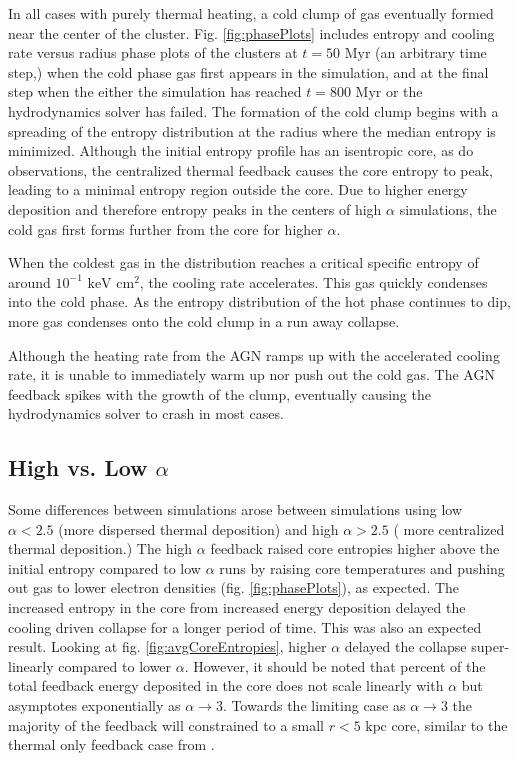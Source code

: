 \documentclass[iop,apjl, twocolappendix]{emulateapj}   %
\begin{document}
In all cases with purely thermal heating, a cold clump of gas eventually formed
near the center of the cluster. Fig. \ref{fig:phasePlots} includes entropy and
cooling rate versus radius phase plots of the clusters at $t=50 \text{ Myr}$
(an arbitrary time step,) when the cold phase gas first appears in the
simulation, and at the final step when the either the simulation has reached
$t=800 \text{ Myr}$ or the hydrodynamics solver has failed. The formation of
the cold clump begins with a spreading of the entropy distribution at the
radius where the median entropy 
is minimized. Although the initial entropy profile has an isentropic core, as
do observations, the centralized thermal feedback causes the core entropy to
peak, leading to a minimal entropy region outside the core. Due to higher
energy deposition and therefore entropy peaks in the centers of high $\alpha$
simulations, the cold gas first forms further from the core for higher
$\alpha$.

When the coldest gas in the distribution reaches a critical specific entropy of
around $10^{-1} \text{ keV} \text{ cm}^2$, the cooling rate accelerates. This
gas quickly condenses into the cold phase. As the entropy distribution of the
hot phase continues to dip, more gas condenses onto the cold clump in a run
away collapse. 

Although the heating rate from the AGN ramps up with the accelerated cooling
rate, it is unable to immediately warm up nor push out the cold gas. The AGN
feedback spikes with the growth of the clump, eventually causing the
hydrodynamics solver to crash in most cases.

\subsection{High vs. Low $\alpha$}
\label{sec:high_vs_low_alpha}

Some differences between simulations arose between simulations using low
$\alpha<2.5$ (more dispersed thermal deposition) and high $\alpha>2.5$ ( more
centralized thermal deposition.) The high $\alpha$ feedback raised core
entropies higher above the initial entropy compared to low $\alpha$ runs by
raising core temperatures and pushing out gas to lower electron densities (fig.
\ref{fig:phasePlots}), as expected.  The increased entropy in the core from
increased energy deposition delayed the cooling driven collapse for a longer
period of time. This was also an expected result. Looking at fig.
\ref{fig:avgCoreEntropies}, higher $\alpha$ delayed the collapse super-linearly
compared to lower $\alpha$. However, it should be noted that percent of the
total feedback energy deposited in the core does not scale linearly with
$\alpha$ but asymptotes exponentially as $\alpha \rightarrow 3$.  Towards the
limiting case as $\alpha \rightarrow 3$ the majority of the feedback will
constrained to a small $r < 5 \text{ kpc}$ core, similar to the thermal only
feedback case from \cite{meece_triggering_2017}.
\end{document}
